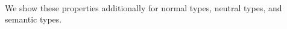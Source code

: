 \documentclass[authoryear, acmsmall, screen, review, nonacm]{acmart}
\begin{document}
\begin{code}[hide]%
\>[0]\AgdaSpace{}%
\AgdaSymbol{:}\AgdaSpace{}%
\AgdaSpace{}%
\AgdaSymbol{(}\AgdaSpace{}%
\AgdaSymbol{:}\AgdaSpace{}%
\AgdaSpace{}%
\AgdaSpace{}%
\AgdaOperator{\AgdaInductiveConstructor{R[}}\AgdaSpace{}%
\AgdaSpace{}%
\AgdaOperator{\AgdaInductiveConstructor{]}}\AgdaSymbol{)}\AgdaSpace{}%
\AgdaSpace{}%
\AgdaSpace{}%
\AgdaSpace{}%
\AgdaSpace{}%
\AgdaSpace{}%
\<%
\\
\>[0]\AgdaSpace{}%
\AgdaSymbol{\AgdaUnderscore{}}\AgdaSpace{}%
\AgdaSymbol{=}\AgdaSpace{}%
\AgdaSpace{}%
\AgdaSymbol{\AgdaUnderscore{}}\<%
\\
\>[0]\AgdaSpace{}%
\AgdaSymbol{=}\AgdaSpace{}%
\AgdaSpace{}%
\AgdaSymbol{\AgdaUnderscore{}}\<%
\\
\>[0]\AgdaSpace{}%
\AgdaSymbol{=}\AgdaSpace{}%
\AgdaSpace{}%
\AgdaSymbol{\AgdaUnderscore{}}\<%
\end{code}

\Ni We show these properties additionally for normal types, neutral types, and semantic types.
\end{document}
